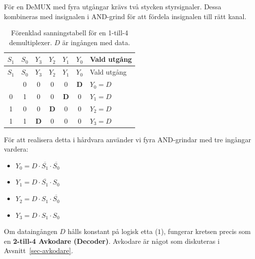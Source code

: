 \documentclass[
  swedish,
  letterpaper,
  oneside,
  openany]{book}
\providecommand{\tightlist}{%
  \setlength{\itemsep}{0pt}\setlength{\parskip}{0pt}}
\begin{document}
\begin{tcolorbox}[enhanced jigsaw, arc=.35mm, bottomrule=.15mm, bottomtitle=1mm, breakable, colback=white, colbacktitle=quarto-callout-note-color!10!white, colframe=quarto-callout-note-color-frame, coltitle=black, left=2mm, leftrule=.75mm, opacityback=0, opacitybacktitle=0.6, rightrule=.15mm, title=\textcolor{quarto-callout-note-color}{\faInfo}\hspace{0.5em}{Exempel: 1-till-4 demultimplexer}, titlerule=0mm, toprule=.15mm, toptitle=1mm]

För en DeMUX med fyra utgångar krävs två stycken styrsignaler. Dessa
kombineras med insignalen i AND-grind för att fördela insignalen till
rätt kanal.

\begin{longtable}[]{@{}ccccccl@{}}
\caption{Förenklad sanningstabell för en 1-till-4 demultiplexer. \(D\)
är ingången med data.}\label{tbl-1-till-4-demux}\tabularnewline
\toprule\noalign{}
\(S_1\) & \(S_0\) & \(Y_3\) & \(Y_2\) & \(Y_1\) & \(Y_0\) & Vald
utgång \\
\midrule\noalign{}
\endfirsthead
\toprule\noalign{}
\(S_1\) & \(S_0\) & \(Y_3\) & \(Y_2\) & \(Y_1\) & \(Y_0\) & Vald
utgång \\
\midrule\noalign{}
\endhead
\bottomrule\noalign{}
\endlastfoot
0 & 0 & 0 & 0 & 0 & \textbf{D} & \(Y_0 = D\) \\
0 & 1 & 0 & 0 & \textbf{D} & 0 & \(Y_1 = D\) \\
1 & 0 & 0 & \textbf{D} & 0 & 0 & \(Y_2 = D\) \\
1 & 1 & \textbf{D} & 0 & 0 & 0 & \(Y_3 = D\) \\
\end{longtable}

För att realisera detta i hårdvara använder vi fyra AND-grindar med tre
ingångar vardera:

\begin{itemize}
\tightlist
\item
  \(Y_0 = D \cdot \overline{S_1} \cdot \overline{S_0}\)
\item
  \(Y_1 = D \cdot \overline{S_1} \cdot S_0\)
\item
  \(Y_2 = D \cdot S_1 \cdot \overline{S_0}\)
\item
  \(Y_3 = D \cdot S_1 \cdot S_0\)
\end{itemize}

Om dataingången \(D\) hålls konstant på logisk etta (\(1\)), fungerar
kretsen precis som en \textbf{2-till-4 Avkodare (Decoder)}. Avkodare är
något som diskuteras i Avsnitt~\ref{sec-avkodare}.

\end{tcolorbox}
\end{document}
